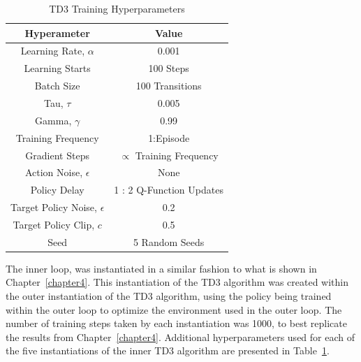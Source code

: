\begin{table}[tb!]
  \caption{TD3 Training Hyperparameters}
  \begin{center}
  \vspace{-12pt}
  \begin{tabular}{c c}
  \textbf{Hyperameter}            & \textbf{Value}                  \\
  \hline
  \hline
  Learning Rate, $\alpha$         & 0.001                           \\
  Learning Starts                 & 100 Steps                       \\
  Batch Size                      & 100 Transitions                 \\
  Tau, $\tau$                     & 0.005                           \\
  Gamma, $\gamma$                 & 0.99                            \\
  Training Frequency              & 1:Episode                       \\
  Gradient Steps                  & $\propto$ Training Frequency    \\
  Action Noise,  $\epsilon$       & None                            \\
  Policy Delay                    & 1 : 2 Q-Function Updates        \\
  Target Policy Noise, $\epsilon$ & 0.2                             \\
  Target Policy Clip, $c$         & 0.5                             \\
  Seed                            & 5 Random Seeds                \\
  \hline
  \hline
  \end{tabular}
  \label{tab:conc_mech_hyperparams}
  \end{center}
\end{table}

The inner loop, was instantiated in a similar fashion to what is shown in Chapter~\ref{chapter4}. This instantiation of the TD3 algorithm was created within the outer instantiation of the TD3 algorithm, using the policy being trained within the outer loop to optimize the environment used in the outer loop. The number of training steps taken by each instantiation was 1000, to best replicate the results from Chapter~\ref{chapter4}. Additional hyperparameters used for each of the five instantiations of the inner TD3 algorithm are presented in Table~\ref{tab:conc_mech_hyperparams}.

